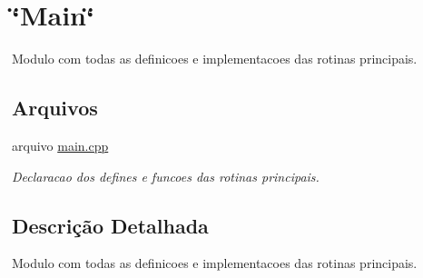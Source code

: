 \hypertarget{group__MOD__MAIN}{
\section{\char`\"{}Main\char`\"{}}
\label{group__MOD__MAIN}
}


Modulo com todas as definicoes e implementacoes das rotinas principais.  


\subsection*{Arquivos}
\begin{DoxyCompactItemize}
\item 
arquivo \hyperlink{main_8cpp}{main.cpp}


\begin{DoxyCompactList}\small\item\em Declaracao dos defines e funcoes das rotinas principais. \item\end{DoxyCompactList}

\end{DoxyCompactItemize}


\subsection{Descrição Detalhada}
Modulo com todas as definicoes e implementacoes das rotinas principais. 